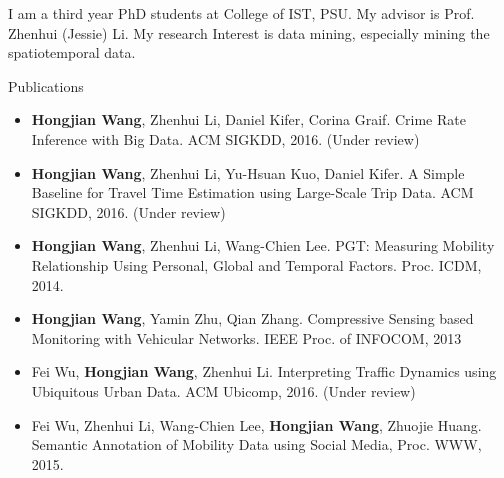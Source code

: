 
I am a third year PhD students at College of IST, PSU. My advisor is Prof. Zhenhui (Jessie) Li. My research Interest is data mining, especially mining the spatiotemporal data.




\vspace{3cm}

\centerline{Publications}

\begin{itemize}
\item \textbf{Hongjian Wang}, Zhenhui Li, Daniel Kifer, Corina Graif. Crime Rate Inference with Big Data. ACM SIGKDD, 2016. (Under review)
\item \textbf{Hongjian Wang}, Zhenhui Li, Yu-Hsuan Kuo, Daniel Kifer. A Simple Baseline for Travel Time Estimation using Large-Scale Trip Data. ACM SIGKDD, 2016. (Under review)
\item \textbf{Hongjian Wang}, Zhenhui Li, Wang-Chien Lee. PGT: Measuring Mobility Relationship Using Personal, Global and Temporal Factors. Proc. ICDM, 2014.
\item \textbf{Hongjian Wang}, Yamin Zhu, Qian Zhang. Compressive Sensing based Monitoring with Vehicular Networks. IEEE Proc. of INFOCOM, 2013
\item Fei Wu, \textbf{Hongjian Wang}, Zhenhui Li. Interpreting Traffic Dynamics using Ubiquitous Urban Data. ACM Ubicomp, 2016. (Under review)
\item Fei Wu, Zhenhui Li, Wang-Chien Lee, \textbf{Hongjian Wang}, Zhuojie Huang. Semantic Annotation of Mobility Data using Social Media, Proc. WWW, 2015.
\end{itemize}

